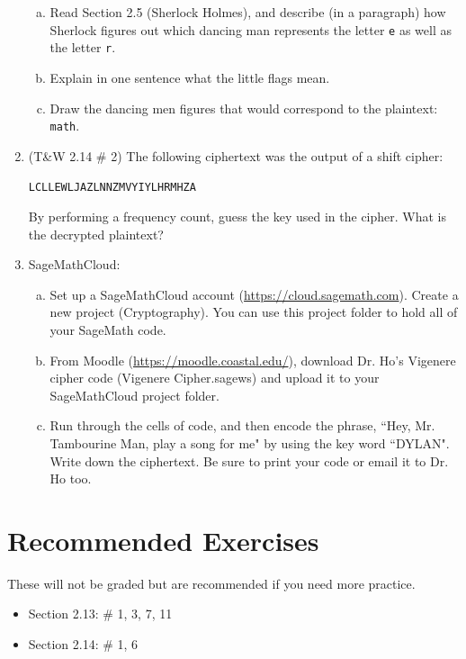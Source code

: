 \documentclass[12pt]{amsart}
\theoremstyle{plain}
\theoremstyle{definition}
\begin{document}
\begin{enumerate}[1.]
		\begin{enumerate}[a.]
			\item Read Section 2.5 (Sherlock Holmes), and describe (in a paragraph) how Sherlock figures out which dancing man represents the letter \texttt{e} as well as the letter \texttt{r}.\\ \begin{framed}\vspace{2in}\end{framed}
			\item Explain in one sentence what the little flags mean.\\\begin{framed}\vspace{1in}\end{framed}
			\item Draw the dancing men figures that would correspond to the plaintext: \texttt{math}.\\ \begin{framed}\vspace{1.5in}\end{framed}
		\end{enumerate}
		\newpage \item (T\&W 2.14 \# 2)  The following ciphertext was the output of a shift cipher:
		\begin{center}
			\texttt{LCLLEWLJAZLNNZMVYIYLHRMHZA}
		\end{center}
		By performing a frequency count, guess the key used in the cipher.  What is the decrypted plaintext?\\ \begin{framed}\vspace{2in}\end{framed}
	\item SageMathCloud:\\
		\begin{enumerate}[a.]
			\item Set up a SageMathCloud account (\url{https://cloud.sagemath.com}).  Create a new project (Cryptography).  You can use this project folder to hold all of your SageMath code.  \\
			\item From Moodle (\url{https://moodle.coastal.edu/}), download Dr. Ho's Vigenere cipher code (Vigenere Cipher.sagews) and upload it to your SageMathCloud project folder.\\
			\item Run through the cells of code, and then encode the phrase, ``Hey, Mr. Tambourine Man, play a song for me" by using the key word ``DYLAN".  Write down the ciphertext.  Be sure to print your code or email it to Dr. Ho too.\\ \begin{framed}\vspace{.5in}\end{framed}
		\end{enumerate}
\end{enumerate}

\section{Recommended Exercises}
\noindent These will not be graded but are recommended if you need more practice.
\begin{itemize}
	\item Section 2.13: \# 1, 3, 7, 11
	\item Section 2.14: \# 1, 6
\end{itemize}
	
\end{document}
